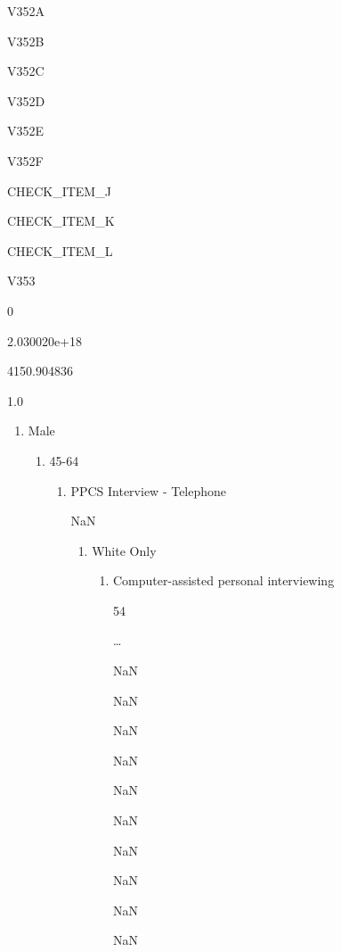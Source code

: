 \documentclass[
  letterpaper,
  DIV=11,
  numbers=noendperiod]{scrreprt}
\providecommand{\tightlist}{%
  \setlength{\itemsep}{0pt}\setlength{\parskip}{0pt}}\usepackage{longtable,booktabs,array}
\begin{document}
V352A

V352B

V352C

V352D

V352E

V352F

CHECK\_ITEM\_J

CHECK\_ITEM\_K

CHECK\_ITEM\_L

V353

0

2.030020e+18

4150.904836

1.0

\begin{enumerate}
\def\labelenumi{(\arabic{enumi})}
\tightlist
\item
  Male

  \begin{enumerate}
  \def\labelenumii{(\arabic{enumii})}
  \setcounter{enumii}{3}
  \tightlist
  \item
    45-64

    \begin{enumerate}
    \def\labelenumiii{(\arabic{enumiii})}
    \setcounter{enumiii}{1}
    \tightlist
    \item
      PPCS Interview - Telephone

      NaN

      \begin{enumerate}
      \def\labelenumiv{(\arabic{enumiv})}
      \tightlist
      \item
        White Only

        \begin{enumerate}
        \def\labelenumv{(\arabic{enumv})}
        \tightlist
        \item
          Computer-assisted personal interviewing

          54

          \ldots{}

          NaN

          NaN

          NaN

          NaN

          NaN

          NaN

          NaN

          NaN

          NaN

          NaN


\end{enumerate}
\end{enumerate}
\end{enumerate}
\end{enumerate}
\end{enumerate}
\end{document}
